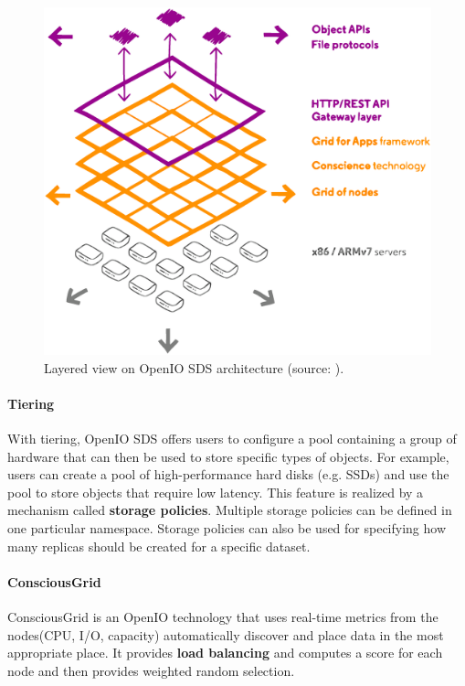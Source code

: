    \begin{figure}[H]
        \centering
        \includegraphics[width=1\textwidth]{obrazky-figures/openio-architecture.eps}
        \caption{Layered view on OpenIO SDS architecture (source: \cite{oioArch}).}
        \label{fig:oioArch}
    \end{figure}


    \paragraph{Tiering}
    With tiering, OpenIO SDS offers users to configure a pool containing a group of hardware that can then be used to store specific types of objects. For example, users can create a pool of high-performance hard disks (e.g. SSDs) and use the pool to store objects that require low latency.
    This feature is realized by a mechanism called \textbf{storage policies}. Multiple storage policies can be defined in one particular namespace. Storage policies can also be used for specifying how many replicas should be created for a specific dataset\cite{oioCoreSolution}.

    \paragraph{ConsciousGrid}
    ConsciousGrid is an OpenIO technology that uses real-time metrics from the nodes(CPU, I/O, capacity) automatically discover and place data in the most appropriate place. It provides \textbf{load balancing} and computes a score for each node and then provides weighted random selection\cite{oioSdsServices}.


